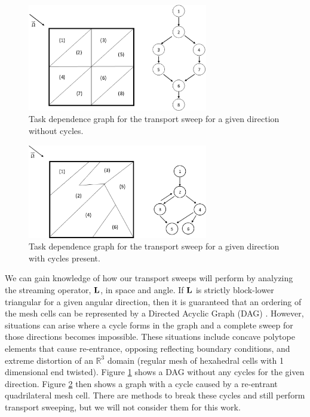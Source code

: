 \begin{figure}
\centering
\includegraphics[width=0.70\textwidth]{figures/sec_Sn/triangle_graph_nocycle.eps}
\caption{Task dependence graph for the transport sweep for a given direction without cycles.}
\label{fig::Sn_Solution_Spatial_Sweeping_sweepNOcycle}
\end{figure}

\begin{figure}
\centering
\includegraphics[width=0.70\textwidth]{figures/sec_Sn/graph_with_cycling.eps}
\caption{Task dependence graph for the transport sweep for a given direction with cycles present.}
\label{fig::Sn_Solution_Spatial_Sweeping_sweepWcycle}
\end{figure}

We can gain knowledge of how our transport sweeps will perform by analyzing the streaming operator, ${\bf L}$, in space and angle. If ${\bf L}$ is strictly block-lower triangular for a given angular direction, then it is guaranteed that an ordering of the mesh cells can be represented by a Directed Acyclic Graph (DAG) \cite{gerasoulis1989static}. However, situations can arise where a cycle forms in the graph and a complete sweep for those directions becomes impossible. These situations include concave polytope elements that cause re-entrance, opposing reflecting boundary conditions, and extreme distortion of an $\mathbb{R}^3$ domain (regular mesh of hexahedral cells with 1 dimensional end twisted). Figure \ref{fig::Sn_Solution_Spatial_Sweeping_sweepNOcycle} shows a DAG without any cycles for the given direction. Figure \ref{fig::Sn_Solution_Spatial_Sweeping_sweepWcycle} then shows a graph with a cycle caused by a re-entrant quadrilateral mesh cell. There are methods to break these cycles and still perform transport sweeping, but we will not consider them for this work.

